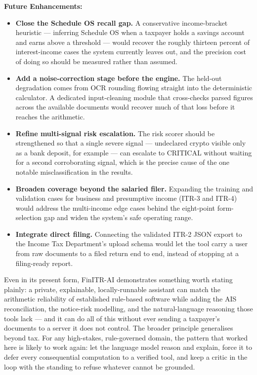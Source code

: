 \documentclass[12pt, a4paper, oneside]{report}
\begin{document}
\noindent\textbf{Future Enhancements:}

\begin{itemize}
    \item \textbf{Close the Schedule OS recall gap.} A conservative
          income-bracket heuristic --- inferring Schedule OS when a taxpayer
          holds a savings account and earns above a threshold --- would recover
          the roughly thirteen percent of interest-income cases the system
          currently leaves out, and the precision cost of doing so should be
          measured rather than assumed.
    \item \textbf{Add a noise-correction stage before the engine.} The held-out
          degradation comes from OCR rounding flowing straight into the
          deterministic calculator. A dedicated input-cleaning module that
          cross-checks parsed figures across the available documents would
          recover much of that loss before it reaches the arithmetic.
    \item \textbf{Refine multi-signal risk escalation.} The risk scorer should
          be strengthened so that a single severe signal --- undeclared crypto
          visible only as a bank deposit, for example --- can escalate to
          CRITICAL without waiting for a second corroborating signal, which is
          the precise cause of the one notable misclassification in the results.
    \item \textbf{Broaden coverage beyond the salaried filer.} Expanding the
          training and validation cases for business and presumptive income
          (ITR-3 and ITR-4) would address the multi-income edge cases behind the
          eight-point form-selection gap and widen the system's safe operating
          range.
    \item \textbf{Integrate direct filing.} Connecting the validated ITR-2 JSON
          export to the Income Tax Department's upload schema would let the tool
          carry a user from raw documents to a filed return end to end, instead
          of stopping at a filing-ready report.
\end{itemize}

Even in its present form, FinITR-AI demonstrates something worth stating plainly:
a private, explainable, locally-runnable assistant can match the arithmetic
reliability of established rule-based software while adding the AIS
reconciliation, the notice-risk modelling, and the natural-language reasoning
those tools lack --- and it can do all of this without ever sending a taxpayer's
documents to a server it does not control. The broader principle generalises
beyond tax. For any high-stakes, rule-governed domain, the pattern that worked
here is likely to work again: let the language model reason and explain, force it
to defer every consequential computation to a verified tool, and keep a critic in
the loop with the standing to refuse whatever cannot be grounded.
\end{document}
